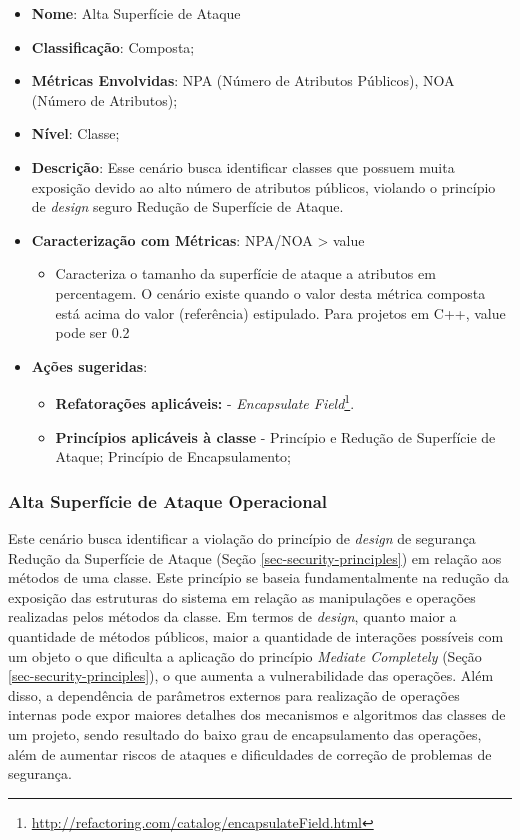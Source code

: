 \begin{itemize}
\item \textbf{Nome}: Alta Superfície de Ataque
\item \textbf{Classificação}: Composta;
\item \textbf{Métricas Envolvidas}: NPA (Número de Atributos Públicos), NOA (Número de Atributos);
\item \textbf{Nível}: Classe;
\item \textbf{Descrição}: Esse cenário busca identificar classes que possuem muita exposição devido ao alto número de atributos públicos, violando o princípio de \emph{design} seguro Redução de Superfície de Ataque.
\item \textbf{Caracterização com Métricas}: NPA/NOA > value
	\begin{itemize}
	\item Caracteriza o tamanho da superfície de ataque a atributos em percentagem. O cenário existe quando o valor desta métrica composta está acima do valor (referência) estipulado. Para projetos em C++, value pode ser 0.2
	\end{itemize}
\item \textbf{Ações sugeridas}:
	\begin{itemize}
	\item \textbf{Refatorações aplicáveis:} - \emph{Encapsulate Field}\footnote{\url{http://refactoring.com/catalog/encapsulateField.html}}.
	\item \textbf{Princípios aplicáveis à classe} - Princípio e Redução de Superfície de Ataque; Princípio de Encapsulamento;
	\end{itemize}
\end{itemize}

\subsubsection{Alta Superfície de Ataque Operacional}

Este cenário busca identificar a violação do princípio de \emph{design} de segurança Redução da Superfície de Ataque (Seção \ref{sec-security-principles}) em relação aos métodos de uma classe. Este princípio se baseia fundamentalmente na redução da exposição das estruturas do sistema em relação as manipulações e operações realizadas pelos métodos da classe. Em termos de \emph{design}, quanto maior a quantidade de métodos públicos, maior a quantidade de interações possíveis com um objeto o que dificulta a aplicação do princípio \emph{Mediate Completely} (Seção \ref{sec-security-principles}), o que aumenta a vulnerabilidade das operações. Além disso, a dependência de parâmetros externos para realização de operações internas pode expor maiores detalhes dos mecanismos e algoritmos das classes de um projeto, sendo resultado do baixo grau de encapsulamento das operações, além de aumentar riscos de ataques e dificuldades de correção de problemas de segurança. 

